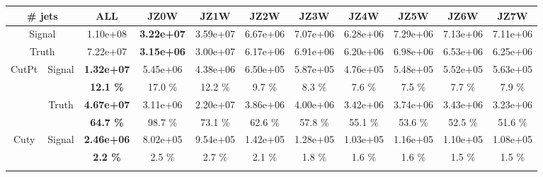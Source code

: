 \begin{landscape} 
\begin{table}
  \centering
  \begin{tabular}{|c|c|>{\bfseries}c|c|c|c|c|c|c|c|c|}
    \hline
     \multicolumn{2}{|c|}{\# jets}  & ALL      & JZ0W     & JZ1W     & JZ2W     & JZ3W     & JZ4W     & JZ5W     & JZ6W     & JZ7W     \\
    \hline                                                              
    \hline                                                              
     \multicolumn{2}{|c|}{Signal}   & 1.10e+08 & 3.22e+07 & 3.59e+07 & 6.67e+06 & 7.07e+06 & 6.28e+06 & 7.29e+06 & 7.13e+06 & 7.11e+06 \\
    \hline                                                              
     \multicolumn{2}{|c|}{Truth}    & 7.22e+07 & 3.15e+06 & 3.00e+07 & 6.17e+06 & 6.91e+06 & 6.20e+06 & 6.98e+06 & 6.53e+06 & 6.25e+06 \\
    \hline                                                              
    \hline                                                              
    \multirow{4}{*}{CutPt}          & \multirow{2}{*}{Signal}   & 1.32e+07 & 5.45e+06 & 4.38e+06 & 6.50e+05 & 5.87e+05 & 4.76e+05 & 5.48e+05 & 5.52e+05 & 5.63e+05 \\
                                    &                           & 12.1 \%  & 17.0 \%  & 12.2 \%  & 9.7 \%   & 8.3 \%   & 7.6 \%   & 7.5 \%   & 7.7 \%   & 7.9 \%   \\
    \cline{2-11}                                                                 
                                    & \multirow{2}{*}{Truth}    & 4.67e+07 & 3.11e+06 & 2.20e+07 & 3.86e+06 & 4.00e+06 & 3.42e+06 & 3.74e+06 & 3.43e+06 & 3.23e+06 \\
                                    &                           & 64.7 \%  & 98.7 \%  & 73.1 \%  & 62.6 \%  & 57.8 \%  & 55.1 \%  & 53.6 \%  & 52.5 \%  & 51.6 \%  \\
    \hline                                                              
    \hline                                                              
    \multirow{4}{*}{Cuty}           & \multirow{2}{*}{Signal}   & 2.46e+06 & 8.02e+05 & 9.54e+05 & 1.42e+05 & 1.28e+05 & 1.03e+05 & 1.16e+05 & 1.10e+05 & 1.08e+05 \\
                                    &                           & 2.2 \%   & 2.5 \%   & 2.7 \%   & 2.1 \%   & 1.8 \%   & 1.6 \%   & 1.6 \%   & 1.5 \%   & 1.5 \%   \\
    \cline{2-11}                                                                                    

\end{tabular}
\end{table}
\end{landscape}
